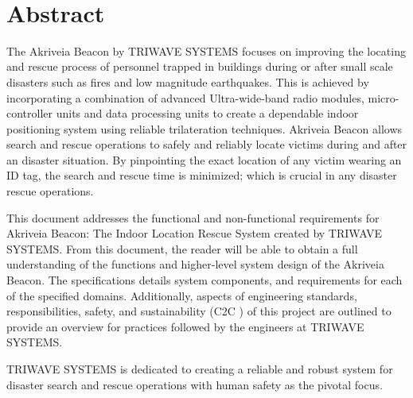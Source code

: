 
\
\section*{Abstract}	%
\medskip
The Akriveia Beacon by TRIWAVE SYSTEMS focuses on improving the locating and rescue process of personnel trapped in buildings during or after small scale disasters such as fires and low magnitude earthquakes. This is achieved by incorporating a combination of advanced Ultra-wide-band radio modules, micro-controller units and data processing units to create a dependable indoor positioning system using reliable trilateration techniques. Akriveia Beacon allows search and rescue operations to safely and reliably locate victims during and after an disaster situation. By pinpointing the exact location of any victim wearing an ID tag, the search and rescue time is minimized; which is crucial in any disaster rescue operations.

\bigskip
This document addresses the functional and non-functional requirements for Akriveia Beacon: The Indoor Location Rescue System created by TRIWAVE SYSTEMS. From this document, the reader will be able to obtain a full understanding of the functions and higher-level system design of the Akriveia Beacon. The specifications details system components, and requirements for each of the specified domains. Additionally, aspects of engineering standards, responsibilities, safety, and sustainability (C2C \cite{R25}) of this project are outlined to provide an overview for practices followed by the engineers at TRIWAVE SYSTEMS.

\bigskip
TRIWAVE SYSTEMS is dedicated to creating a reliable and robust system for disaster search and rescue operations with human safety as the pivotal focus.

%